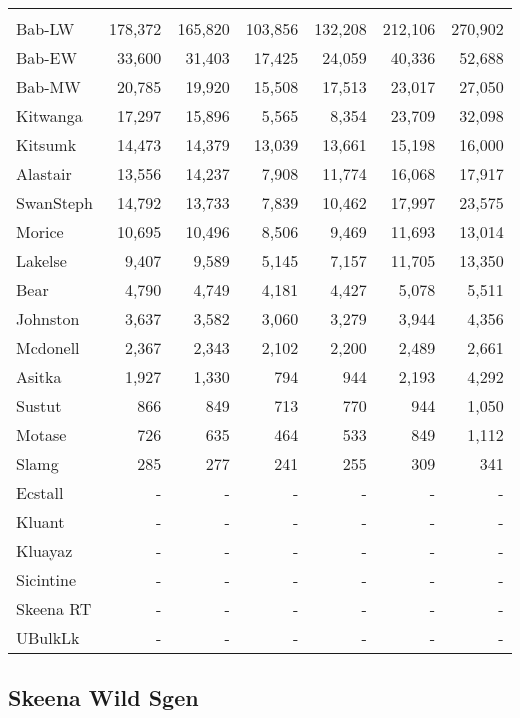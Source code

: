 \documentclass[french,11pt]{book}
\begin{document}
\begin{longtable}[t]{lrrrrrr}
\midrule\\ Bab-LW & 178,372 & 165,820 & 103,856 & 132,208 & 212,106 & 270,902\\ Bab-EW & 33,600 & 31,403 & 17,425 & 24,059 & 40,336 & 52,688\\ Bab-MW & 20,785 & 19,920 & 15,508 & 17,513 & 23,017 & 27,050\\ Kitwanga & 17,297 & 15,896 & 5,565 & 8,354 & 23,709 & 32,098\\ Kitsumk & 14,473 & 14,379 & 13,039 & 13,661 & 15,198 & 16,000\\ Alastair & 13,556 & 14,237 & 7,908 & 11,774 & 16,068 & 17,917\\ SwanSteph & 14,792 & 13,733 & 7,839 & 10,462 & 17,997 & 23,575\\ Morice & 10,695 & 10,496 & 8,506 & 9,469 & 11,693 & 13,014\\ Lakelse & 9,407 & 9,589 & 5,145 & 7,157 & 11,705 & 13,350\\ Bear & 4,790 & 4,749 & 4,181 & 4,427 & 5,078 & 5,511\\ Johnston & 3,637 & 3,582 & 3,060 & 3,279 & 3,944 & 4,356\\ Mcdonell & 2,367 & 2,343 & 2,102 & 2,200 & 2,489 & 2,661\\ Asitka & 1,927 & 1,330 & 794 & 944 & 2,193 & 4,292\\ Sustut & 866 & 849 & 713 & 770 & 944 & 1,050\\ Motase & 726 & 635 & 464 & 533 & 849 & 1,112\\ Slamg & 285 & 277 & 241 & 255 & 309 & 341\\ Ecstall & - & - & - & - & - & -\\ Kluant & - & - & - & - & - & -\\ Kluayaz & - & - & - & - & - & -\\ Sicintine & - & - & - & - & - & -\\ Skeena RT & - & - & - & - & - & -\\ UBulkLk & - & - & - & - & - & -\\* \end{longtable}

\endgroup{} \endgroup{}

\clearpage

\subsection{Skeena Wild Sgen}\label{skeena-wild-sgen}
\end{document}
